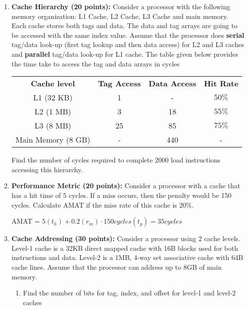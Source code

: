 \documentclass[a4paper, 11pt]{exam}
\begin{document}
\begin{enumerate}
 \item \textbf{Cache Hierarchy (20 points): } Consider a processor with the following memory
organization: L1 Cache, L2 Cache, L3 Cache and main memory. Each cache stores both tags
and data. The data and tag arrays are going to be accessed with the same index value. Assume
that the processor does \textbf{serial} tag/data look-up (first tag lookup and then data access) for L2
and L3 caches and \textbf{parallel} tag/data look-up for L1 cache. The table given below provides the
time take to access the tag and data arrays in cycles
\newline


\begin{center}
\begin{tabular}{|c|c|c|c|}
 \hline
 \textbf{Cache level} & \textbf{Tag Access} & \textbf{Data Access} & \textbf{Hit Rate} \\
 L1 (32 KB)  & 1 & - & $50\%$ \\
 \hline
 L2 (1 MB) & 3 & 18 & $55\%$ \\
 \hline
 L3 (8 MB) & 25 & 85 & $75\%$ \\
 \hline
 Main Memory (8 GB) & - & 440 & - \\
 \hline
\end{tabular}
\end{center}

Find the number of cycles required to complete 2000 load instructions accessing this
hierarchy. \newline

 
\item \textbf{Performance Metric (20 points): } Consider a processor with a cache that has a hit time
of 5 cycles. If a miss occurs, then the penalty would be 150 cycles. Calculate AMAT if the
miss rate of this cache is $20\%$.\newline

AMAT = $5(t_h) + 0.2(r_m)\cdot150cycles(t_p) = 35cycles$

\item \textbf {Cache Addressing (30 points): }  Consider a processor using 2 cache levels. Level-1 cache is a
32KB direct mapped cache with 16B blocks used for both instructions and data. Level-2 is a
1MB, 4-way set associative cache with 64B cache lines. Assume that the processor can
address up to 8GB of main memory. 


 \begin{enumerate} [label=(\alph*)]
 \item  Find the number of bits for tag, index, and offset for level-1 and level-2 caches


\end{enumerate}
\end{enumerate}
\end{document}
